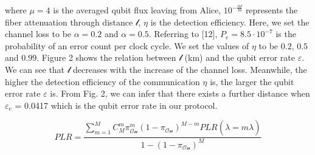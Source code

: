 \documentclass[a4paper,11pt]{article}
\begin{document}
where $\mu = 4$ is the averaged qubit flux leaving from Alice, $10^{- \frac{\alpha \mathcal{l}}{10}}$ represents the fiber attenuation through distance $\mathcal{l}$,
$\eta$ is the detection efficiency. Here, we set the channel loss to be $\alpha = 0.2$ and
$\alpha = 0.5$. Referring to [12], $P_e = 8.5 \cdot 10^{−7}$ is the probability of an error count per clock cycle. We set the values of $\eta$ to be $0.2$, $0.5$ and $0.99$.
Figure 2 shows the relation between $\mathcal{l}$ (km) and the qubit error rate $\varepsilon$. We can see that $\mathcal{l}$ decreases with the increase of the channel loss. Meanwhile, the higher the detection efficiency of the communication $\eta$ is, the larger the qubit error rate $\varepsilon$ is. From Fig. 2, we can infer that there exists a further distance when $\varepsilon_e$ = 0.0417 which is the qubit error rate in our protocol.

\begin{equation*}
 PLR = \dfrac{\sum_{m=1}^M C_M^m \pi_{\mathcal{On}}^m (1 - \pi_{\mathcal{On}})^{M-m} PLR (\hat{\lambda} = m\lambda)}
 {1 - (1 -\pi_{\mathcal{On}})^M}
\end{equation*}
\end{document}
